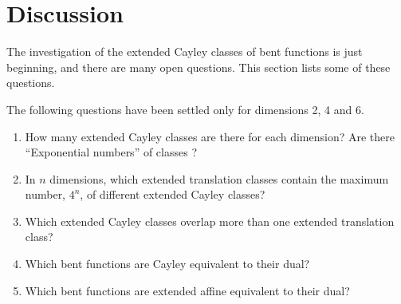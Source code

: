 \documentclass[12pt,a4paper]{article}
\begin{document}

\section{Discussion}
\label{sec-Discussion}
The investigation of the extended Cayley classes of bent functions is just beginning, and there are many open questions.
This section lists some of these questions.

The following questions have been settled only for dimensions 2, 4 and 6.
\begin{enumerate}
\item
How many extended Cayley classes are there for each dimension?
Are there ``Exponential numbers'' of classes  \cite{Kan83exponential}?
\item
In $n$ dimensions,
which extended translation classes contain the maximum number, $4^n$, of different extended Cayley classes?
\item
Which extended Cayley classes overlap more than one extended translation class?
\item
Which bent functions are Cayley equivalent to their dual?
\item
Which bent functions are extended affine equivalent to their dual?
\end{enumerate}
\end{document}
